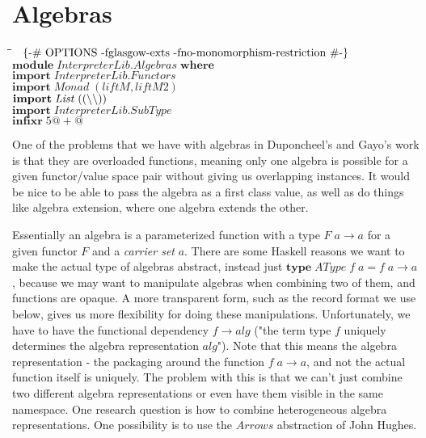 \documentclass[10pt]{article}
\newlength{\lwidth}\setlength{\lwidth}{4.5cm}
\newlength{\cwidth}\setlength{\cwidth}{8mm} %
\newcommand{\Conid}[1]{\mathit{#1}}
\newcommand{\Varid}[1]{\mathit{#1}}
\begin{document}
\section{Algebras}
\begin{tabbing}
\qquad\=\hspace{\lwidth}\=\hspace{\cwidth}\=\+\kill
${\mbox{\enskip\{-\# OPTIONS -fglasgow-exts -fno-monomorphism-restriction  \#-\}\enskip}}$\\
${\mathbf{module}\;\Conid{\Conid{InterpreterLib}.Algebras}\;\mathbf{where}}$\\
${}$\\
${\mathbf{import}\;\Conid{\Conid{InterpreterLib}.Functors}}$\\
${\mathbf{import}\;\Conid{Monad}\;(\Varid{liftM},\Varid{liftM2})}$\\
${\mathbf{import}\;\Conid{List}\;((\mathbin{\char92 \char92 }))}$\\
${\mathbf{import}\;\Conid{\Conid{InterpreterLib}.SubType}}$\\
${}$\\
${\mathbf{infixr}\;\mathrm{5}\mathbin{@+@}}$
\end{tabbing}

One of the problems that we have with algebras in Duponcheel's and
Gayo's work is that they are overloaded functions, meaning only one
algebra is possible for a given functor/value space pair without
giving us overlapping instances. It would be nice to be able to pass
the algebra as a first class value, as well as do things like algebra
extension, where one algebra extends the other.

Essentially an algebra is a parameterized function with a type \ensuremath{\Conid{F}\;\Varid{a}\to \Varid{a}} for a given functor \ensuremath{\Conid{F}} and a \emph{carrier set} \ensuremath{\Varid{a}}. There are
some Haskell reasons we want to make the actual type of algebras
abstract, instead just \ensuremath{\mathbf{type}\;\Conid{AType}\;\Varid{f}\;\Varid{a}\mathrel{=}\Varid{f}\;\Varid{a}\to \Varid{a}}, because we may
want to manipulate algebras when combining two of them, and functions
are opaque. A more transparent form, such as the record format we use
below, gives us more flexibility for doing these
manipulations. Unfortunately, we have to have the functional
dependency \ensuremath{\Varid{f}\to \Varid{alg}} ("the term type \ensuremath{\Varid{f}} uniquely determines the
algebra representation \ensuremath{\Varid{alg}}"). Note that this means the algebra
representation - the packaging around the function \ensuremath{\Varid{f}\;\Varid{a}\to \Varid{a}}, and not
the actual function itself is uniquely. The problem with this is that
we can't just combine two different algebra representations or even
have them visible in the same namespace. One research question is how
to combine heterogeneous algebra representations. One possibility is
to use the \ensuremath{\Conid{Arrows}} abstraction of John Hughes.
\end{document}
